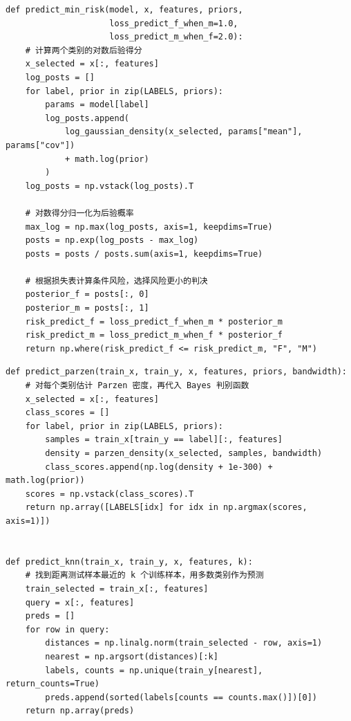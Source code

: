 \documentclass[UTF8,a4paper,12pt]{ctexart}
\begin{document}
\begin{lstlisting}[caption={Exp.1 minimum-risk Bayes decision},label={lst:exp1-min-risk}]
def predict_min_risk(model, x, features, priors,
                     loss_predict_f_when_m=1.0,
                     loss_predict_m_when_f=2.0):
    # 计算两个类别的对数后验得分
    x_selected = x[:, features]
    log_posts = []
    for label, prior in zip(LABELS, priors):
        params = model[label]
        log_posts.append(
            log_gaussian_density(x_selected, params["mean"], params["cov"])
            + math.log(prior)
        )
    log_posts = np.vstack(log_posts).T

    # 对数得分归一化为后验概率
    max_log = np.max(log_posts, axis=1, keepdims=True)
    posts = np.exp(log_posts - max_log)
    posts = posts / posts.sum(axis=1, keepdims=True)

    # 根据损失表计算条件风险，选择风险更小的判决
    posterior_f = posts[:, 0]
    posterior_m = posts[:, 1]
    risk_predict_f = loss_predict_f_when_m * posterior_m
    risk_predict_m = loss_predict_m_when_f * posterior_f
    return np.where(risk_predict_f <= risk_predict_m, "F", "M")
\end{lstlisting}

\begin{lstlisting}[caption={Exp.1 Parzen and kNN classifiers},label={lst:exp1-nonparametric}]
def predict_parzen(train_x, train_y, x, features, priors, bandwidth):
    # 对每个类别估计 Parzen 密度，再代入 Bayes 判别函数
    x_selected = x[:, features]
    class_scores = []
    for label, prior in zip(LABELS, priors):
        samples = train_x[train_y == label][:, features]
        density = parzen_density(x_selected, samples, bandwidth)
        class_scores.append(np.log(density + 1e-300) + math.log(prior))
    scores = np.vstack(class_scores).T
    return np.array([LABELS[idx] for idx in np.argmax(scores, axis=1)])


def predict_knn(train_x, train_y, x, features, k):
    # 找到距离测试样本最近的 k 个训练样本，用多数类别作为预测
    train_selected = train_x[:, features]
    query = x[:, features]
    preds = []
    for row in query:
        distances = np.linalg.norm(train_selected - row, axis=1)
        nearest = np.argsort(distances)[:k]
        labels, counts = np.unique(train_y[nearest], return_counts=True)
        preds.append(sorted(labels[counts == counts.max()])[0])
    return np.array(preds)
\end{lstlisting}
\end{document}
